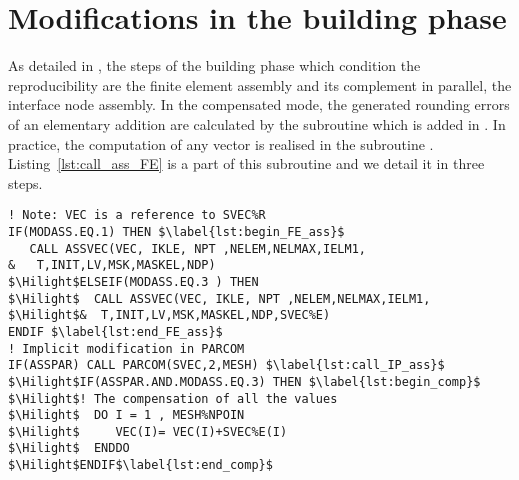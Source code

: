 \section{Modifications in the building phase }
\label{sec:build_implement}
%
As detailed in \cite{LaND16}, the steps of the building
phase which condition the reproducibility
are the finite element assembly and its complement in parallel,
the interface node assembly.
In the compensated mode, the generated rounding errors of an elementary
addition are calculated by the subroutine  which is added in \bief.
In practice, the computation of any vector
is realised in the subroutine .
Listing~\ref{lst:call_ass_FE} is a part of this subroutine and
we detail it in three steps.
%
\begin{lstlisting}[language=TelFortran,
caption={The call of the FE assembly under the two modes of the computation in
\telfile{VECTOS}},label={lst:call_ass_FE},escapechar=\$]
! Note: VEC is a reference to SVEC%R
IF(MODASS.EQ.1) THEN $\label{lst:begin_FE_ass}$
   CALL ASSVEC(VEC, IKLE, NPT ,NELEM,NELMAX,IELM1,
&   T,INIT,LV,MSK,MASKEL,NDP)
$\Hilight$ELSEIF(MODASS.EQ.3 ) THEN
$\Hilight$  CALL ASSVEC(VEC, IKLE, NPT ,NELEM,NELMAX,IELM1,
$\Hilight$&  T,INIT,LV,MSK,MASKEL,NDP,SVEC%E)
ENDIF $\label{lst:end_FE_ass}$
! Implicit modification in PARCOM
IF(ASSPAR) CALL PARCOM(SVEC,2,MESH) $\label{lst:call_IP_ass}$
$\Hilight$IF(ASSPAR.AND.MODASS.EQ.3) THEN $\label{lst:begin_comp}$
$\Hilight$! The compensation of all the values
$\Hilight$  DO I = 1 , MESH%NPOIN
$\Hilight$     VEC(I)= VEC(I)+SVEC%E(I)
$\Hilight$  ENDDO
$\Hilight$ENDIF$\label{lst:end_comp}$
\end{lstlisting}
%
